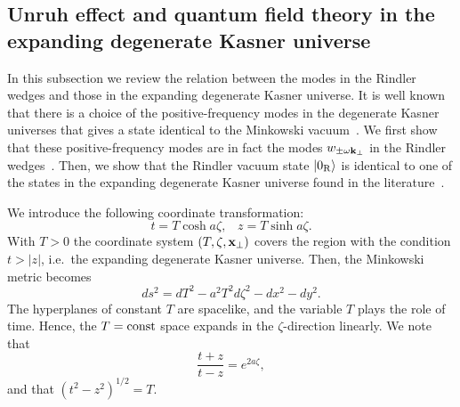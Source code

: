 \documentclass[12pt,nofootinbib,floatfix,aps,prd,showpacs,amsmath,amssymb,eqsecnum]{revtex4-2}
\begin{document}
\subsection{Unruh effect and quantum field theory in the expanding 
degenerate Kasner universe}
\label{section2:Milne} 

In this subsection 
we review the relation between the modes in the Rindler
wedges and those in 
the expanding degenerate Kasner universe.  It is
well known that there is a choice of the positive-frequency modes in the
degenerate Kasner universes that
gives a state identical to the Minkowski
vacuum~\cite{Fullingetal74}.  We first show that
these positive-frequency modes are in fact the modes $w_{\pm
\omega{\bf k}_\bot}$ in the Rindler wedges~\cite{Gerlach88}.  Then, we
show that the Rindler vacuum state $|0_{\rm R}\rangle$ is identical to
one of the states in the expanding
degenerate Kasner universe found in the 
literature~\cite{Birrelletal82,Fullingetal74}. 

We introduce the following coordinate transformation:
\begin{equation}
t  =  T\cosh a\zeta, \;\;\;
z  =  T\sinh a\zeta.
\end{equation}
With $T>0$ the coordinate system $(T,\zeta,{\bf x}_\bot)$ covers the
region with the condition $t > |z|$, i.e.~the expanding degenerate Kasner
universe. Then, the Minkowski metric becomes
\begin{equation}
ds^2 = dT^2 - a^2 T^2d\zeta^2 - dx^2 - dy^2.
\end{equation}
The hyperplanes 
of constant $T$ are spacelike, and the variable $T$ plays the
role of time.
Hence, the $T= {\rm const}$ space expands in the $\zeta$-direction
linearly. We note that
\begin{equation}
\frac{t+z}{t-z} = e^{2a\zeta}, \label{sec2:2azeta}
\end{equation}
and that $(t^2-z^2)^{1/2}=T$.
\end{document}
